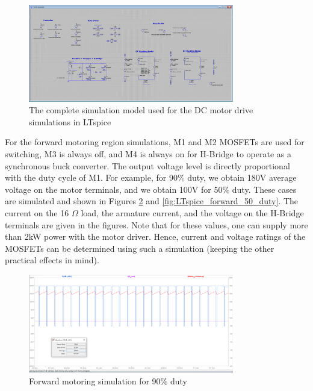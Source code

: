 \begin{figure}[H]
    \centering
    \includegraphics[width=0.8\textwidth]{Figures/Spice_Figures/Schematics/Whole_Model_Schematic.PNG}
    \caption{The complete simulation model used for the DC motor drive simulations in LTspice}
    \label{fig:LTspice_whole_sch}
\end{figure}

For the forward motoring region simulations, M1 and M2 MOSFETs are used for switching, M3 is always off, and M4 is always on for H-Bridge to operate as a synchronous buck converter. The output voltage level is directly proportional with the duty cycle of M1. For example, for 90\% duty, we obtain 180V average voltage on the motor terminals, and we obtain 100V for 50\% duty. These cases are simulated and shown in Figures \ref{fig:LTspice_forward_90_duty} and \ref{fig:LTspice_forward_50_duty}. The current on the 16 $\Omega$ load, the armature current, and the voltage on the H-Bridge terminals are given in the figures. Note that for these values, one can supply more than 2kW power with the motor driver. Hence, current and voltage ratings of the MOSFETs can be determined using such a simulation (keeping the other practical effects in mind).

\begin{figure}[H]
    \centering
    \includegraphics[width=0.8\textwidth]{Figures/Spice_Figures/Motoring_Full_Duty_Sim_1.PNG}
    \caption{Forward motoring simulation for 90\% duty}
    \label{fig:LTspice_forward_90_duty}
\end{figure}

